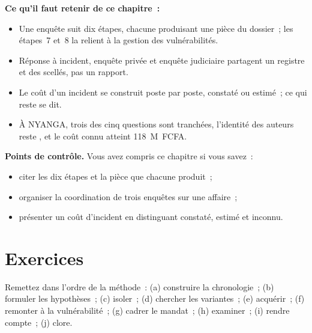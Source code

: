 \separateur

\begin{boxresume}
\textbf{Ce qu'il faut retenir de ce chapitre~:}
\begin{itemize}
    \item Une enquête suit dix étapes, chacune produisant une pièce du
          dossier~; les étapes~7 et~8 la relient à la gestion des
          vulnérabilités.
    \item Réponse à incident, enquête privée et enquête judiciaire
          partagent un registre et des scellés, pas un rapport.
    \item Le coût d'un incident se construit poste par poste, constaté ou
          estimé~; ce qui reste \NEK{} se dit.
    \item À NYANGA, trois des cinq questions sont tranchées, l'identité des
          auteurs reste \NEK{}, et le coût connu atteint 118~M~FCFA.
\end{itemize}
\end{boxresume}

\begin{boxinfo}
\textbf{Points de contrôle.} Vous avez compris ce chapitre si vous savez~:
\begin{itemize}
    \item citer les dix étapes et la pièce que chacune produit~;
    \item organiser la coordination de trois enquêtes sur une affaire~;
    \item présenter un coût d'incident en distinguant constaté, estimé et
          inconnu.
\end{itemize}
\end{boxinfo}

\section*{Exercices}

\begin{boxexo}[title={\ding{45}\quad Exercice~14.1. Ordonner \niveaubase}]
Remettez dans l'ordre de la méthode~: (a) construire la chronologie~;
(b) formuler les hypothèses~; (c) isoler~; (d) chercher les variantes~;
(e) acquérir~; (f) remonter à la vulnérabilité~; (g) cadrer le mandat~;
(h) examiner~; (i) rendre compte~; (j) clore.
\end{boxexo}

